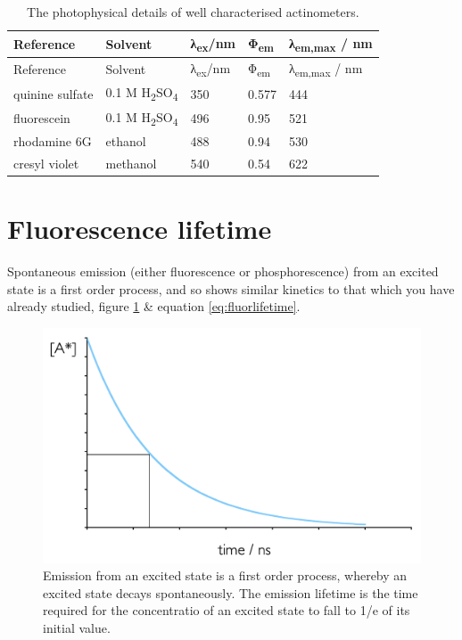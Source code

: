 \documentclass[
]{book}
\begin{document}
\begin{longtable}[]{@{}lllll@{}}
\caption{\label{tab:actinometer} The photophysical details of well characterised actinometers.}\tabularnewline
\toprule
Reference & Solvent & λ\textsubscript{ex}/nm & Φ\textsubscript{em} & λ\textsubscript{em,max} / nm \\
\midrule
\endfirsthead
\toprule
Reference & Solvent & λ\textsubscript{ex}/nm & Φ\textsubscript{em} & λ\textsubscript{em,max} / nm \\
\midrule
\endhead
quinine sulfate & 0.1 M H\textsubscript{2}SO\textsubscript{4} & 350 & 0.577 & 444 \\
fluorescein & 0.1 M H\textsubscript{2}SO\textsubscript{4} & 496 & 0.95 & 521 \\
rhodamine 6G & ethanol & 488 & 0.94 & 530 \\
cresyl violet & methanol & 540 & 0.54 & 622 \\
\bottomrule
\end{longtable}

\hypertarget{fluorescence-lifetime}{%
\section{Fluorescence lifetime}\label{fluorescence-lifetime}}

Spontaneous emission (either fluorescence or phosphorescence) from an excited state is a first order process, and so shows similar kinetics to that which you have already studied, figure \ref{fig:fluorlifetime} \& equation \eqref{eq:fluorlifetime}.

\begin{figure}

{\centering \includegraphics[width=0.5\linewidth]{images/fluorlifetime} 

}

\caption{Emission from an excited state is a first order process, whereby an excited state decays spontaneously. The emission lifetime is the time required for the concentratio of an excited state to fall to 1/e of its initial value.}\label{fig:fluorlifetime}
\end{figure}
\end{document}
